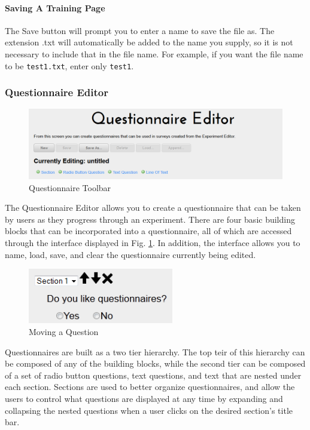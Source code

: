 \documentclass[article]{ij4uq}              %
\begin{document}
\paragraph{Saving A Training Page}
The Save button will prompt you to enter a name to save the file as. The extension .txt will automatically be added to the name you supply, so it is not necessary to include that in the file name. For example, if you want the file name to be \texttt{test1.txt}, enter only \texttt{test1}.

\subsubsection {Questionnaire Editor}

\begin{figure}[h!]
 \centering
 \includegraphics[width=5.0in]{figures/question_toolbar.png}
 \caption{Questionnaire Toolbar}
 \label{fig:questTool}
\end{figure}
\FloatBarrier

The Questionnaire Editor allows you to create a questionnaire that can be taken by users as they progress through an experiment. There are four basic building blocks that can be incorporated into a questionnaire, all of which are accessed through the interface displayed in Fig. \ref{fig:questTool}. In addition, the interface allows you to name, load, save, and clear the questionnaire currently being edited.

\begin{figure}[h!]
 \centering
 \includegraphics[width=2.5in]{figures/question_edit.png}
 \caption{Moving a Question}
 \label{fig:questEdit}
\end{figure}
\FloatBarrier

Questionnaires are built as a two tier hierarchy.  The top teir of this hierarchy can be composed of any of the building blocks, while the second tier can be composed of a set of radio button questions, text questions, and text that are nested under each section.  Sections are used to better organize questionnaires, and allow the users to control what questions are displayed at any time by expanding and collapsing the nested questions when a user clicks on the desired section's title bar.  
\end{document}
